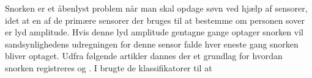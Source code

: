 Snorken er et åbenlyst problem når man skal opdage søvn ved hjælp af sensorer, idet at en af de primære sensorer der bruges til at bestemme om personen sover er lyd amplitude.
Hvis denne lyd amplitude gentagne gange optager snorken vil sandsynlighedens udregningen for denne sensor falde hver eneste gang snorken bliver optaget. 
Udfra følgende artikler dannes der et grundlag for hvordan snorken registreres \citep{Dafna2013} og \citep{Calabrese20111101}.
I \citep{Dafna2013} brugte de klassifikatorer til at 